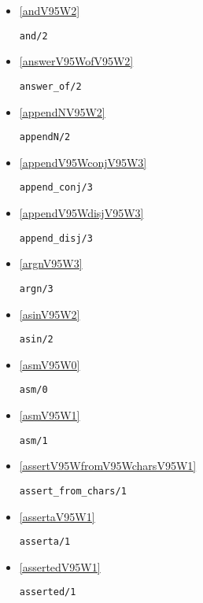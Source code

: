 \begin{itemize}
\item \ref{andV95W2} 
\begin{verbatim}
and/2
\end{verbatim}

\item \ref{answerV95WofV95W2} 
\begin{verbatim}
answer_of/2
\end{verbatim}

\item \ref{appendNV95W2} 
\begin{verbatim}
appendN/2
\end{verbatim}

\item \ref{appendV95WconjV95W3} 
\begin{verbatim}
append_conj/3
\end{verbatim}

\item \ref{appendV95WdisjV95W3} 
\begin{verbatim}
append_disj/3
\end{verbatim}

\item \ref{argnV95W3} 
\begin{verbatim}
argn/3
\end{verbatim}

\item \ref{asinV95W2} 
\begin{verbatim}
asin/2
\end{verbatim}

\item \ref{asmV95W0} 
\begin{verbatim}
asm/0
\end{verbatim}

\item \ref{asmV95W1} 
\begin{verbatim}
asm/1
\end{verbatim}

\item \ref{assertV95WfromV95WcharsV95W1} 
\begin{verbatim}
assert_from_chars/1
\end{verbatim}

\item \ref{assertaV95W1} 
\begin{verbatim}
asserta/1
\end{verbatim}

\item \ref{assertedV95W1} 
\begin{verbatim}
asserted/1
\end{verbatim}


\end{itemize}
